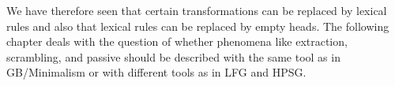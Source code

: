 \largerpage
We have therefore seen that certain transformations can be replaced by lexical rules and also that
lexical rules can be replaced by empty heads. 
The following chapter
deals with the question of whether phenomena like extraction, scrambling, and passive should be
described with the same tool as in GB/Minimalism or with different tools as in LFG and HPSG.




